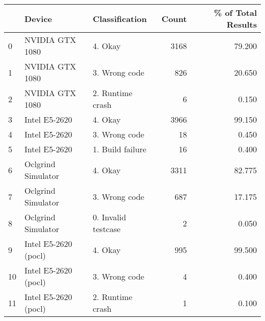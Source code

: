 \begin{tabular}{lllrr}
\toprule
{} &                Device &       Classification &  Count &  \% of Total Results \\
\midrule
0  &       NVIDIA GTX 1080 &              4. Okay &   3168 &              79.200 \\
1  &       NVIDIA GTX 1080 &        3. Wrong code &    826 &              20.650 \\
2  &       NVIDIA GTX 1080 &     2. Runtime crash &      6 &               0.150 \\
3  &         Intel E5-2620 &              4. Okay &   3966 &              99.150 \\
4  &         Intel E5-2620 &        3. Wrong code &     18 &               0.450 \\
5  &         Intel E5-2620 &     1. Build failure &     16 &               0.400 \\
6  &    Oclgrind Simulator &              4. Okay &   3311 &              82.775 \\
7  &    Oclgrind Simulator &        3. Wrong code &    687 &              17.175 \\
8  &    Oclgrind Simulator &  0. Invalid testcase &      2 &               0.050 \\
9  &  Intel E5-2620 (pocl) &              4. Okay &    995 &              99.500 \\
10 &  Intel E5-2620 (pocl) &        3. Wrong code &      4 &               0.400 \\
11 &  Intel E5-2620 (pocl) &     2. Runtime crash &      1 &               0.100 \\
\bottomrule
\end{tabular}
